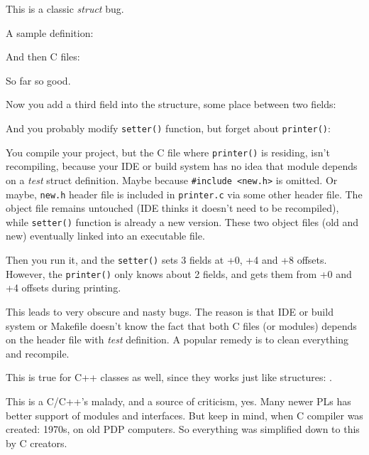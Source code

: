 
This is a classic \emph{struct} bug.

A sample definition:



And then C files:





So far so good.

Now you add a third field into the structure, some place between two fields:



And you probably modify \verb|setter()| function, but forget about \verb|printer()|:



You compile your project, but the C file where \verb|printer()| is residing, isn't recompiling,
because your \ac{IDE} or build system
has no idea that module depends on a \emph{test} struct definition.
Maybe because \verb|#include <new.h>| is omitted.
Or maybe, \verb|new.h| header file is included in \verb|printer.c| via some other header file.
The object file remains untouched (\ac{IDE} thinks it doesn't need to be recompiled),
while \verb|setter()| function is already a new version.
These two object files (old and new) eventually linked into an executable file.

Then you run it, and the \verb|setter()| sets 3 fields at +0, +4 and +8 offsets.
However, the \verb|printer()| only knows about 2 fields, and gets them from +0 and +4 offsets during printing.

This leads to very obscure and nasty bugs.
The reason is that \ac{IDE} or build system or Makefile doesn't know the fact that both C files (or modules) depends on the header
file with \emph{test} definition.
A popular remedy is to clean everything and recompile.

This is true for C++ classes as well, since they works just like structures: .

This is a C/C++'s malady, and a source of criticism, yes.
Many newer \ac{PL}s has better support of modules and interfaces.
But keep in mind, when C compiler was created: 1970s, on old PDP computers.
So everything was simplified down to this by C creators.

